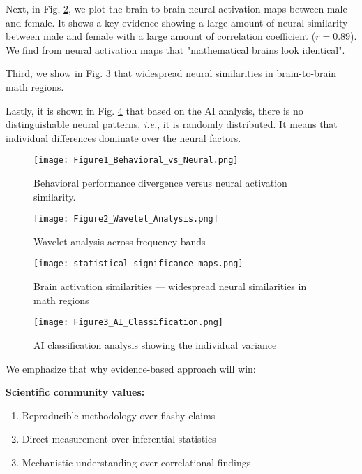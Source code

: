 \documentclass[pdflatex,sn-nature]{sn-jnl}%
\theoremstyle{thmstyleone}%
\theoremstyle{thmstyletwo}%
\theoremstyle{thmstylethree}%
\begin{document}
Next, in Fig, \ref{fig:2}, we plot the brain-to-brain neural activation maps between male and female. It shows a key evidence showing a large amount of neural similarity between male and female with a large amount of correlation coefficient ($r = 0.89$). We find from neural activation maps that "mathematical brains look identical".

Third, we show in Fig. \ref{fig:3} that widespread neural similarities in brain-to-brain math regions. 

Lastly, it is shown in Fig. \ref{fig:4} that based on the AI analysis, there is no distinguishable neural patterns, {\it i.e.}, it is randomly distributed. It means that individual differences dominate over the neural factors.

\begin{figure}[htbp]
\centering
\texttt{[image: Figure1\_Behavioral\_vs\_Neural.png]}
\caption{Behavioral performance divergence versus neural activation similarity.}
\label{fig:1}
\end{figure}

\begin{figure}[htbp]
\texttt{[image: Figure2\_Wavelet\_Analysis.png]}
\caption{Wavelet analysis across frequency bands}
\label{fig:2}
\end{figure}

\begin{figure}[htbp]
\centering
\texttt{[image: statistical\_significance\_maps.png]}
\caption{Brain activation similarities --- widespread neural similarities in math regions}
\label{fig:3}
\end{figure}

\begin{figure}[htbp]
\texttt{[image: Figure3\_AI\_Classification.png]}
\caption{AI classification analysis showing the individual variance}
\label{fig:4}
\end{figure}



\medskip\noindent
We emphasize that why evidence-based approach will win:

\medskip\noindent
\textbf{Scientific community values:}
\begin{enumerate}
\item Reproducible methodology over flashy claims
\item Direct measurement over inferential statistics
\item Mechanistic understanding over correlational findings
\end{enumerate}
\end{document}
